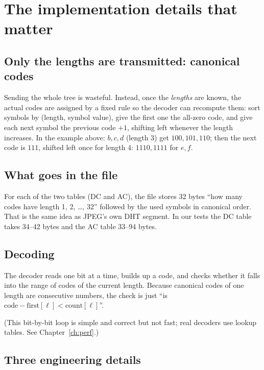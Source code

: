 \section{The implementation details that matter}

\subsection{Only the lengths are transmitted: canonical codes}

Sending the whole tree is wasteful. Instead, once the \emph{lengths} are known, the actual codes are assigned by a fixed rule so the decoder can recompute them: sort symbols by (length, symbol value), give the first one the all-zero code, and give each next symbol the previous code $+1$, shifting left whenever the length increases. In the example above: $b,c,d$ (length 3) get $100,101,110$; then the next code is $111$, shifted left once for length 4: $1110,1111$ for $e,f$.



\subsection{What goes in the file}

For each of the two tables (DC and AC), the file stores 32 bytes ``how many codes have length 1, 2, \dots, 32'' followed by the used symbols in canonical order. That is the same idea as JPEG's own DHT segment. In our tests the DC table takes 34--42 bytes and the AC table 33--94 bytes.

\subsection{Decoding}

The decoder reads one bit at a time, builds up a code, and checks whether it falls into the range of codes of the current length. Because canonical codes of one length are consecutive numbers, the check is just ``is $\text{code}-\text{first}[\ell]<\text{count}[\ell]$''.

(This bit-by-bit loop is simple and correct but not fast; real decoders use lookup tables. See Chapter~\ref{ch:perf}.)

\subsection{Three engineering details}


